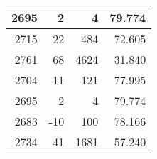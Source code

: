 \begin{longtable}{|r|r|r|r|}
		2695                                                                                               & 2                                                      & 4                                                               & 79.774                                                                                                               \\ \hline
		2715                                                                                               & 22                                                     & 484                                                             & 72.605                                                                                                               \\ \hline
		2761                                                                                               & 68                                                     & 4624                                                            & 31.840                                                                                                               \\ \hline
		2704                                                                                               & 11                                                     & 121                                                             & 77.995                                                                                                               \\ \hline
		2695                                                                                               & 2                                                      & 4                                                               & 79.774                                                                                                               \\ \hline
		2683                                                                                               & -10                                                    & 100                                                             & 78.166                                                                                                               \\ \hline
		2734                                                                                               & 41                                                     & 1681                                                            & 57.240                                                                                                               \\ \hline

\end{longtable}
